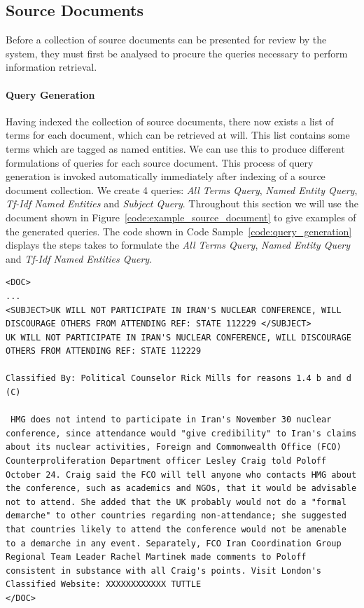 \documentclass{l4proj}
\newenvironment{codelisting}{\captionsetup{type=listing}}{}
\begin{document}
\subsection{Source Documents}
Before a collection of source documents can be presented for review by the system, they must first be analysed to procure the queries necessary to perform information retrieval.
\paragraph{Query Generation} \label{querygen}
Having indexed the collection of source documents, there now exists a list of terms for each document, which can be retrieved at will.
This list contains some terms which are tagged as named entities. We can use this to produce different formulations of queries for each source document. This process of query generation is invoked automatically immediately after indexing of a source document collection.
We create 4 queries: \textit{All Terms Query}, \textit{Named Entity Query}, \textit{Tf-Idf Named Entities} and \textit{Subject Query}.
Throughout this section we will use the document shown in Figure~\ref{code:example_source_document} to give examples of the generated queries.
The code shown in Code Sample~\ref{code:query_generation} displays the steps takes to formulate the \textit{All Terms Query}, \textit{Named Entity Query} and \textit{Tf-Idf Named Entities Query}.
\begin{codelisting}
\begin{verbatim}
<DOC>
...
<SUBJECT>UK WILL NOT PARTICIPATE IN IRAN'S NUCLEAR CONFERENCE, WILL DISCOURAGE OTHERS FROM ATTENDING REF: STATE 112229 </SUBJECT>
UK WILL NOT PARTICIPATE IN IRAN'S NUCLEAR CONFERENCE, WILL DISCOURAGE OTHERS FROM ATTENDING REF: STATE 112229

Classified By: Political Counselor Rick Mills for reasons 1.4 b and d (C)

 HMG does not intend to participate in Iran's November 30 nuclear conference, since attendance would "give credibility" to Iran's claims about its nuclear activities, Foreign and Commonwealth Office (FCO) Counterproliferation Department officer Lesley Craig told Poloff October 24. Craig said the FCO will tell anyone who contacts HMG about the conference, such as academics and NGOs, that it would be advisable not to attend. She added that the UK probably would not do a "formal demarche" to other countries regarding non-attendance; she suggested that countries likely to attend the conference would not be amenable to a demarche in any event. Separately, FCO Iran Coordination Group Regional Team Leader Rachel Martinek made comments to Poloff consistent in substance with all Craig's points. Visit London's Classified Website: XXXXXXXXXXXX TUTTLE
</DOC>
\end{verbatim}
\label{code:example_source_document}
\end{codelisting}
\end{document}
